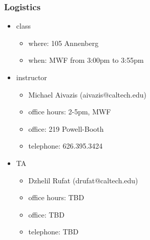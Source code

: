 %
%


\begin{frame}[fragile]
%
  \frametitle{Logistics}
%
  \begin{itemize}
%
  \item class
    \begin{itemize}
    \item where: 105 Annenberg
    \item when: MWF from 3:00pm to 3:55pm
    \end{itemize}
%
  \item instructor
    \begin{itemize}
    \item Michael Aivazis (aivazis@caltech.edu)
    \item office hours: 2-5pm, MWF  
    \item office: 219 Powell-Booth
    \item telephone: 626.395.3424
    \end{itemize}
%
  \item TA
    \begin{itemize}
    \item Dzhelil Rufat (drufat@caltech.edu)
    \item office hours: TBD
    \item office: TBD
    \item telephone: TBD
    \end{itemize}
%
  \end{itemize}
%
\end{frame}

